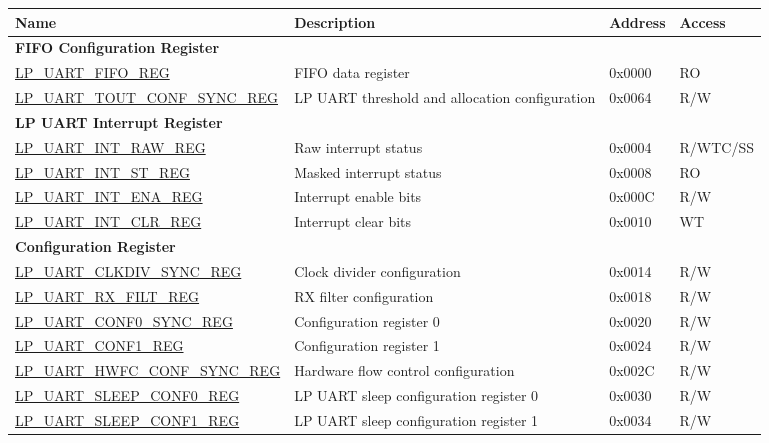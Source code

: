 \begin{longtable}{ | p{6.6cm} | p{6.5cm} | p{1.3cm} | p{1.6cm} | }
\hline\rowcolor{lightgray}
Name & Description &  Address & Access \\ \hline
\endhead
\multicolumn{4}{|l|}{\textbf{FIFO Configuration Register}} \\ \hline
\hyperref[regdesc:LPUARTFIFOREG]{LP\_UART\_FIFO\_REG} & FIFO data register & 0x0000 & RO \\ \hline
\hyperref[regdesc:LPUARTTOUTCONFSYNCREG]{LP\_UART\_TOUT\_CONF\_SYNC\_REG} & LP UART threshold and allocation configuration & 0x0064 & R/W \\ \hline
\multicolumn{4}{|l|}{\textbf{LP UART Interrupt Register}} \\ \hline
\hyperref[regdesc:LPUARTINTRAWREG]{LP\_UART\_INT\_RAW\_REG} & Raw interrupt status & 0x0004 & R/WTC/SS \\ \hline
\hyperref[regdesc:LPUARTINTSTREG]{LP\_UART\_INT\_ST\_REG} & Masked interrupt status & 0x0008 & RO \\ \hline
\hyperref[regdesc:LPUARTINTENAREG]{LP\_UART\_INT\_ENA\_REG} & Interrupt enable bits & 0x000C & R/W \\ \hline
\hyperref[regdesc:LPUARTINTCLRREG]{LP\_UART\_INT\_CLR\_REG} & Interrupt clear bits & 0x0010 & WT \\ \hline
\multicolumn{4}{|l|}{\textbf{Configuration Register}} \\ \hline
\hyperref[regdesc:LPUARTCLKDIVSYNCREG]{LP\_UART\_CLKDIV\_SYNC\_REG} & Clock divider configuration & 0x0014 & R/W \\ \hline
\hyperref[regdesc:LPUARTRXFILTREG]{LP\_UART\_RX\_FILT\_REG} & RX filter configuration & 0x0018 & R/W \\ \hline
\hyperref[regdesc:LPUARTCONF0SYNCREG]{LP\_UART\_CONF0\_SYNC\_REG} & Configuration register 0 & 0x0020 & R/W \\ \hline
\hyperref[regdesc:LPUARTCONF1REG]{LP\_UART\_CONF1\_REG} & Configuration register 1 & 0x0024 & R/W \\ \hline
\hyperref[regdesc:LPUARTHWFCCONFSYNCREG]{LP\_UART\_HWFC\_CONF\_SYNC\_REG} & Hardware flow control configuration & 0x002C & R/W \\ \hline
\hyperref[regdesc:LPUARTSLEEPCONF0REG]{LP\_UART\_SLEEP\_CONF0\_REG} & LP UART sleep configuration register 0 & 0x0030 & R/W \\ \hline
\hyperref[regdesc:LPUARTSLEEPCONF1REG]{LP\_UART\_SLEEP\_CONF1\_REG} & LP UART sleep configuration register 1 & 0x0034 & R/W \\ \hline

\end{longtable}
